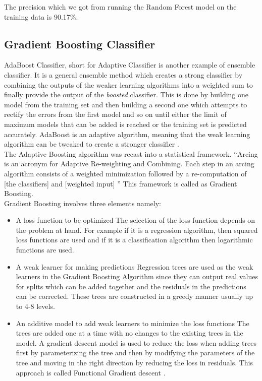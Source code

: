 The precision which we got from running the Random Forest model on the training data is 90.17\%.


\subsection{Gradient Boosting Classifier}
AdaBoost Classifier, short for Adaptive Classifier is another example of ensemble classifier. 
It is a general ensemble method which creates a strong classifier by combining the outputs of the weaker learning algorithms into a weighted sum to finally provide the output of the \emph{boosted} classifier. This is done by building one model from the training set and then building a second one which attempts to rectify the errors from the first model and so on until either the limit of maximum models that can be added is reached or the training set is predicted accurately. AdaBoost is an adaptive algorithm, meaning that the weak learning algorithm can be tweaked to create a stronger classifier \cite{link15}. \\
The Adaptive Boosting algorithm was recast into a statistical framework. ``Arcing is an acronym for Adaptive Re-weighting and Combining. Each step in an arcing algorithm consists of a weighted minimization followed by a re-computation of [the classifiers] and [weighted input] \cite{link15}''
This framework is called as Gradient Boosting. \\
Gradient Boosting involves three elements namely:
\begin{itemize}
 \item{A loss function to be optimized}
 The selection of the loss function depends on the problem at hand. For example if it is a regression algorithm, then squared loss functions are used and if it is a classification algorithm then logarithmic functions are used.
 \item{A weak learner for making predictions}
 Regression trees are used as the weak learners in the Gradient Boosting Algorithm since they can output real values for splits which can be added together and the residuals in the predictions can be corrected. These trees are constructed in a greedy manner usually up to 4-8 levels.
 \item{An additive model to add weak learners to minimize the loss functions}
 The trees are added one at a time with no changes to the existing trees in the model. A gradient descent model is used to reduce the loss when adding trees first by parameterizing the tree and then by modifying the parameters of the tree and moving in the right direction by reducing the loss in residuals. This approach is called Functional Gradient descent \cite{link15}.
\end{itemize}

